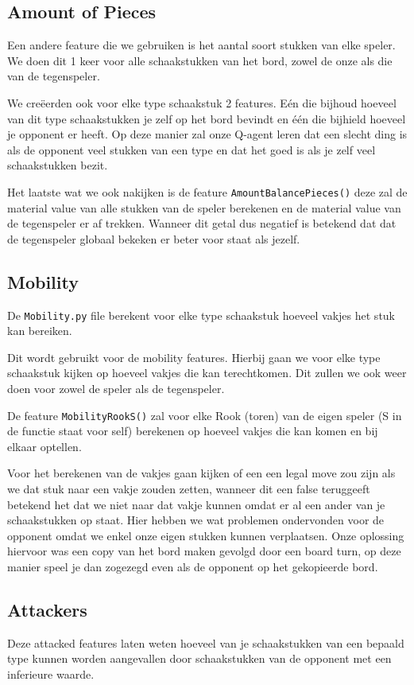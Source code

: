 \documentclass[a4paper,openany]{uantwerpenassignment}
\newcommand{\codeword}[1]{
    \colorbox{code}{\texttt{\textcolor{codetext}{#1}}}
}
\begin{document}
\subsection{Amount of Pieces}
Een andere feature die we gebruiken is het aantal soort stukken van elke speler. We doen dit 1 keer voor alle schaakstukken van het bord, zowel de onze als die van de tegenspeler. 

We creëerden ook voor elke type schaakstuk 2 features. Eén die bijhoud hoeveel van dit type schaakstukken je zelf op het bord bevindt en één die bijhield hoeveel je opponent er heeft. Op deze manier zal onze Q-agent leren dat een slecht ding is als de opponent veel stukken van een type en dat het goed is als je zelf veel schaakstukken bezit.

Het laatste wat we ook nakijken is de feature \codeword{AmountBalancePieces()} deze zal de material value van alle stukken van de speler berekenen en de material value van de tegenspeler er af trekken. Wanneer dit getal dus negatief is betekend dat dat de tegenspeler globaal bekeken er beter voor staat als jezelf.

\subsection{Mobility}
De \codeword{Mobility.py} file berekent voor elke type schaakstuk hoeveel vakjes het stuk kan bereiken. 

Dit wordt gebruikt voor de mobility features. Hierbij gaan we voor elke type schaakstuk kijken op hoeveel vakjes die kan terechtkomen. Dit zullen we ook weer doen voor zowel de speler als de tegenspeler.

De feature \codeword{MobilityRookS()} zal voor elke Rook (toren) van de eigen speler (S in de functie staat voor self) berekenen op hoeveel vakjes die kan komen en bij elkaar optellen.

Voor het berekenen van de vakjes gaan kijken of een een legal move zou zijn als we dat stuk naar een vakje zouden zetten, wanneer dit een false teruggeeft betekend het dat we niet naar dat vakje kunnen omdat er al een ander van je schaakstukken op staat. Hier hebben we wat problemen ondervonden voor de opponent omdat we enkel onze eigen stukken kunnen verplaatsen. Onze oplossing hiervoor was een copy van het bord maken gevolgd door een board turn, op deze manier speel je dan zogezegd even als de opponent op het gekopieerde bord. 

\subsection{Attackers}
Deze attacked features laten weten hoeveel van je schaakstukken van een bepaald type kunnen worden aangevallen door schaakstukken van de opponent met een inferieure waarde. 
\end{document}
